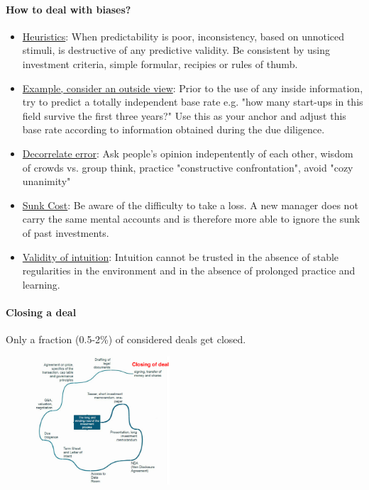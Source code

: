 \paragraph{How to deal with biases?}
\begin{itemize}
    \item \underline{Heuristics}: When predictability is poor, inconsistency,
        based on unnoticed stimuli, is destructive of any predictive validity.
        Be consistent by using investment criteria, simple formular, recipies
        or rules of thumb.
    \item \underline{Example, consider an outside view}: Prior to the use of any
        inside information, try to predict a totally independent base rate e.g.
        "how many start-ups in this field survive the first three years?"
        Use this as your anchor and adjust this base rate according to information
        obtained during the due diligence.
    \item \underline{Decorrelate error}: Ask people's opinion indepentently of each
        other, wisdom of crowds vs. group think, practice "constructive confrontation",
        avoid "cozy unanimity"
    \item \underline{Sunk Cost}: Be aware of the difficulty to take a loss. A new
        manager does not carry the same mental accounts and is therefore more
        able to ignore the sunk of past investments.
    \item \underline{Validity of intuition}: Intuition cannot be trusted in the
        absence of stable regularities in the environment and in the absence of
        prolonged practice and learning.
\end{itemize}

\paragraph{Closing a deal}
Only a fraction (0.5-2\%) of considered deals get closed.

\begin{figure}[h]
    \centering
    \includegraphics[width=0.45\textwidth]{Pictures/closing_Deal.png}
\end{figure}

